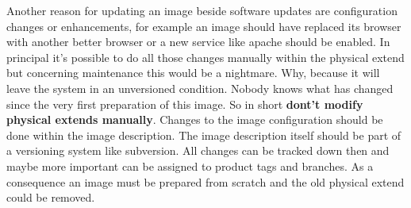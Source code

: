 Another reason for updating an image beside software updates are
configuration changes or enhancements, for example an image should
have replaced its browser with another better browser or a new service
like apache should be enabled. In principal it's possible to do all
those changes manually within the physical extend but concerning
maintenance this would be a nightmare. Why, because it will leave the
system in an unversioned condition. Nobody knows what has changed
since the very first preparation of this image. So in short
\textbf{dont't modify physical extends manually}. Changes to the image
configuration should be done within the image description. The
image description itself should be part of a versioning system like
subversion. All changes can be tracked down then and maybe more
important can be assigned to product tags and branches. As a consequence
an image must be prepared from scratch and the old physical extend
could be removed.

